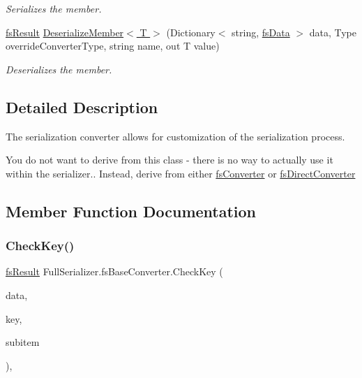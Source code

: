 \begin{DoxyCompactItemize}
\begin{DoxyCompactList}\small\item\em Serializes the member. \end{DoxyCompactList}\item 
\hyperlink{struct_full_serializer_1_1fs_result}{fs\+Result} \hyperlink{class_full_serializer_1_1fs_base_converter_a6df76d1eac0b4a6577845b4c9ddaa79d}{Deserialize\+Member$<$ T $>$} (Dictionary$<$ string, \hyperlink{class_full_serializer_1_1fs_data}{fs\+Data} $>$ data, Type override\+Converter\+Type, string name, out T value)
\begin{DoxyCompactList}\small\item\em Deserializes the member. \end{DoxyCompactList}\end{DoxyCompactItemize}


\subsection{Detailed Description}
The serialization converter allows for customization of the serialization process. 

You do not want to derive from this class -\/ there is no way to actually use it within the serializer.. Instead, derive from either \hyperlink{class_full_serializer_1_1fs_converter}{fs\+Converter} or \hyperlink{class_full_serializer_1_1fs_direct_converter}{fs\+Direct\+Converter}

\subsection{Member Function Documentation}
\mbox{\label{class_full_serializer_1_1fs_base_converter_ab42a513c517a3ed26ea228bb33aedd47}} 
\subsubsection{\texorpdfstring{Check\+Key()}{CheckKey()}\hspace{0.1cm}{\footnotesize\ttfamily [1/2]}}
{\footnotesize\ttfamily \hyperlink{struct_full_serializer_1_1fs_result}{fs\+Result} Full\+Serializer.\+fs\+Base\+Converter.\+Check\+Key (\begin{DoxyParamCaption}\item[{\hyperlink{class_full_serializer_1_1fs_data}{fs\+Data}}]{data,  }\item[{string}]{key,  }\item[{out \hyperlink{class_full_serializer_1_1fs_data}{fs\+Data}}]{subitem }\end{DoxyParamCaption})\hspace{0.3cm}{\ttfamily [inline]}, {\ttfamily [protected]}}



